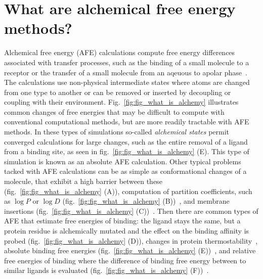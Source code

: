 \documentclass[9pt,bestpractices]{livecoms}
\begin{document}
\section{What are alchemical free energy methods?}
\label{sec:intro}
Alchemical free energy (AFE) calculations compute free energy differences associated with transfer processes, such as the binding of a small molecule to a receptor or the transfer of a small molecule from an aqeuous to apolar phase~\cite{zwanzig1954hightemperature}. 
The calculations use non-physical intermediate states where atoms are changed from one type to another or can be removed or inserted by decoupling or coupling with their environment. Fig.~\ref{fig:fig_what_is_alchemy} illustrates common changes of free energies that may be difficult to compute with conventional computational methods, but are more readily tractable with AFE methods. In these types of simulations so-called \textit{alchemical states} permit converged calculations for large changes, such as the entire removal of a ligand from a binding site, as seen in fig.~\ref{fig:fig_what_is_alchemy} (E). This type of simulation is known as an absolute AFE calculation. Other typical problems tacked with AFE calculations can be as simple as conformational changes of a molecule, that exhibit a high barrier between these (fig.~\ref{fig:fig_what_is_alchemy} (A)), computation of partition coefficients, such as $\log P$ or $\log D$ (fig.~\ref{fig:fig_what_is_alchemy} (B))~\cite{rustenburg2016measuring, bosisio2016blinded}, and membrane insertions (fig.~\ref{fig:fig_what_is_alchemy} (C))~\cite{}. Then there are common types of AFE that estimate free energies of binding: the ligand stays the same, but a protein residue is alchemically mutated and the effect on the binding affinity is probed (fig.~\ref{fig:fig_what_is_alchemy} (D))\cite{hauser2018predicting,aldeghi2018accurate}, changes in protein thermostability~\cite{seeliger2010protein,gapsys2016insights,gapsys2016accurate,aldeghi2019accurate}, absolute binding free energies (fig.~\ref{fig:fig_what_is_alchemy} (E))~\cite{}, and relative free energies of binding where the difference of binding free energy between to similar ligands is evaluated (fig.~\ref{fig:fig_what_is_alchemy} (F))~\cite{}.
\end{document}
